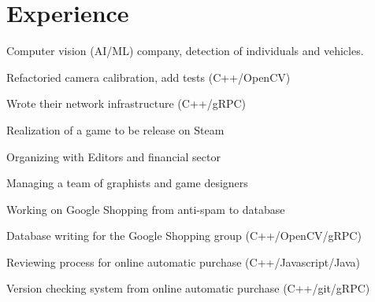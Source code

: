 \documentclass[a4paper]{deedy-resume} %
\begin{document}
\hfill%
%
%
\begin{minipage}[t]{0.66\textwidth} %


\section{Experience}


	Computer vision (AI/ML) company, detection of individuals 
	and	vehicles.
	\vspace{\topsep} %
	\begin{tightitemize}
		\item Refactoried camera calibration, add tests (C++/OpenCV)
		\item Wrote their network infrastructure (C++/gRPC)
	\end{tightitemize}

\sectionspace


	Realization of a game to be release on Steam
	\begin{tightitemize}
		\item Organizing with Editors and financial sector
		\item Managing a team of graphists and game designers
	\end{tightitemize}

\sectionspace %


	Working on Google Shopping from anti-spam to database
	\begin{tightitemize}
		\item Database writing for the Google Shopping group (C++/OpenCV/gRPC)
		\item Reviewing process for online automatic purchase (C++/Javascript/Java)
		\item Version checking system from online automatic purchase (C++/git/gRPC)
	\end{tightitemize}


\end{minipage}
\end{document}
